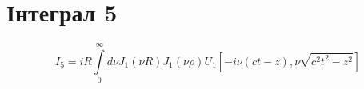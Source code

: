 \section{Інтеграл 5}

\begin{equation}
I_5 = i R \int \limits_{0}^{\infty} d \nu J_1 \left( \nu R \right) 
J_1 \left( \nu \rho \right)
U_1 \left[ - i \nu \left( ct - z \right), \nu \sqrt{c^2t^2 - z^2} \right]
\end{equation}
